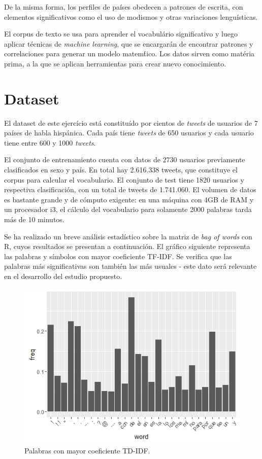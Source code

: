 \documentclass[11pt,a4paper]{article}
\begin{document}
  De la misma forma, los perfiles de pa\'ises obedecen a patrones de escrita, con elementos significativos como el uso de modismos y otras variaciones lengu\'isticas. 

  El corpus de texto se usa para aprender el vocabul\'ario significativo y luego aplicar t\'ecnicas de {\em machine learning}, que se encargar\'an de encontrar patrones y correlaciones para generar un modelo matem\'tico. Los datos sirven como mat\'eria prima, a la que se aplican herramientas para crear nuevo conocimiento.


\section{Dataset}

  El dataset de este ejerc\'icio est\'a constitu\'ido por cientos de {\em tweets} de usuarios de 7 pa\'ises de habla hisp\'anica. Cada pa\'is tiene {\em tweets} de 650 usuarios y cada usuario tiene entre 600 y 1000 {\em tweets}. 

  El conjunto de entrenamiento cuenta con datos de 2730 usuarios previamente clasificados en sexo y pa\'is. En total hay 2.616.338 tweets, que constituye el corpus para calcular el vocabulario. El conjunto de test tiene 1820 usuarios y respectiva clasificaci\'on, con un total de tweets de 1.741.060. El volumen de datos es bastante grande y de c\'omputo exigente: en una m\'aquina con 4GB de RAM y un procesador i3, el c\'alculo del vocabulario para solamente 2000 palabras tarda m\'as de 10 minutos.

  Se ha realizado un breve an\'alisis estad\'istico sobre la matriz de {\em bag of words} con R, cuyos resultados se presentan a continuaci\'on. El gr\'afico siguiente representa las palabras y s\'imbolos con mayor coeficiente TF-IDF. Se verifica que las palabras m\'as significativas son tambi\'en las m\'as usuales - este dato ser\'a relevante en el desarrollo del estudio propuesto.
  
  \begin{figure}[ht!]
    \includegraphics[width=\linewidth]{most_used_words.png}
    \caption{Palabras con mayor coeficiente TD-IDF.}
    \label{fig:most_used_words}
  \end{figure}
    
\end{document}

